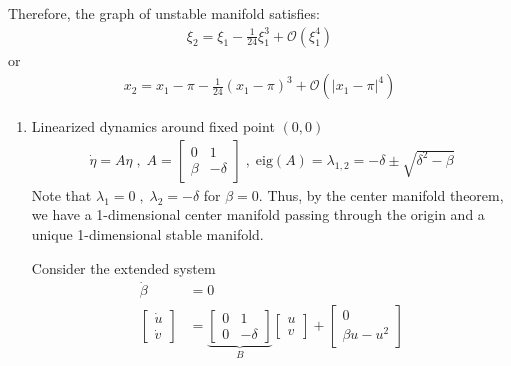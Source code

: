 \begin{solution}[4.2]
Therefore, the graph of unstable manifold satisfies:
\begin{align}
	\xi_2 = \xi_1 - \frac{1}{24}\xi_1^3 + \mathcal{O}(\xi_1^4)
\end{align}
or
\begin{align}\boxed{
	x_2 = x_1 - \pi -\frac{1}{24}(x_1 - \pi)^3 + \mathcal{O}(|x_1 - \pi|^4)
}\end{align}
\end{solution}

\begin{solution}[4.3]
	\leavevmode
\begin{enumerate}
\item Linearized dynamics around fixed point $(0,0)$
\begin{align}
	\dot{\eta} = A\eta \; , \; A = \begin{bmatrix}
		0 & 1 \\ \beta & -\delta
	\end{bmatrix} \; , \; \text{eig}(A) = \lambda_{1,2} = -\delta \pm \sqrt{\delta^2 - \beta}
\end{align}
Note that $\lambda_1 = 0 \; , \; \lambda_2 = -\delta$ for $\beta = 0$. Thus, by the center manifold theorem, we have a 1-dimensional center manifold passing through the origin and a unique 1-dimensional stable manifold.

Consider the extended system
\begin{align}
	\dot{\beta} &= 0 \\
	\begin{bmatrix}
		\dot{u} \\ \dot{v}
	\end{bmatrix}
	&= \underbrace{\begin{bmatrix}
		0 & 1 \\ 0 & -\delta
	\end{bmatrix}}_{B} \begin{bmatrix}
		u \\ v
	\end{bmatrix}
	+
	\begin{bmatrix}
		0 \\ \beta u - u^2
	\end{bmatrix}
\end{align}


\end{enumerate}
\end{solution}
